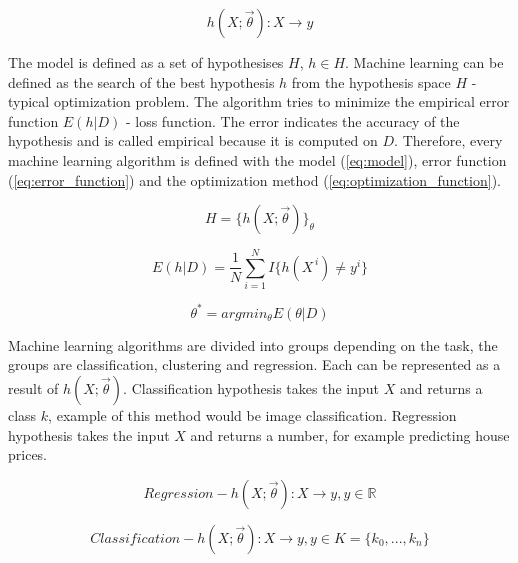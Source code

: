 \documentclass[times, utf8, diplomski]{fer}
\begin{document}
\begin{equation} \label{eq:hypotesis}
	h(X ; \vec{\theta}) : X \to y
\end{equation}


The model is defined as a set of hypothesises $H$, $h \in H$. Machine learning can be defined as the search of the best hypothesis $h$ from the hypothesis space $H$ - typical optimization problem. The algorithm tries to minimize the empirical error function $E(h|D)$ - loss function. The error indicates the accuracy of the hypothesis and is called empirical because it is computed on $D$. Therefore, every machine learning algorithm is defined with the model (\ref{eq:model}), error function (\ref{eq:error_function}) and the optimization method (\ref{eq:optimization_function}).

\begin{equation} \label{eq:model}
	H = \{ h(X ; \vec{\theta}) \}_{\theta}
\end{equation}

\begin{equation} \label{eq:error_function}
	E(h|D) =  \frac{1}{N} \displaystyle\sum_{i=1}^{N} I\{h(X^{\,i}) \neq y^{i}\}
\end{equation}

\begin{equation} \label{eq:optimization_function}
	\theta^{*} = argmin_{\theta} E(\theta | D)
\end{equation}


Machine learning algorithms are divided into groups depending on the task, the groups are classification, clustering and regression. Each can be represented as a result of $h(X ; \vec{\theta})$. Classification hypothesis takes the input $X$ and returns a class $k$, example of this method would be image classification. Regression hypothesis takes the input $X$ and returns a number, for example predicting house prices.

\begin{equation} \label{eq:regression_def}
	Regression - h(X ; \vec{\theta}) : X \to y, y \in \mathbb{R}
\end{equation}

\begin{equation} \label{eq:classification_def}
	Classification  - h(X ; \vec{\theta}) : X \to y, y \in K = \{k_{0}, ..., k_{n}\}
\end{equation}
\end{document}
